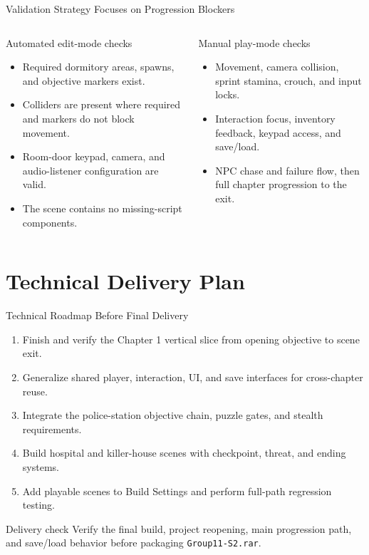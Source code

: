 \documentclass[aspectratio=169,10pt]{beamer}
\begin{document}
\begin{frame}{Validation Strategy Focuses on Progression Blockers}
  \begin{columns}[T,onlytextwidth]
    \begin{block}{Automated edit-mode checks}
      \begin{itemize}
        \item Required dormitory areas, spawns, and objective markers exist.
        \item Colliders are present where required and markers do not block movement.
        \item Room-door keypad, camera, and audio-listener configuration are valid.
        \item The scene contains no missing-script components.
      \end{itemize}
    \end{block}
    \begin{block}{Manual play-mode checks}
      \begin{itemize}
        \item Movement, camera collision, sprint stamina, crouch, and input locks.
        \item Interaction focus, inventory feedback, keypad access, and save/load.
        \item NPC chase and failure flow, then full chapter progression to the exit.
      \end{itemize}
    \end{block}
  \end{columns}
\end{frame}

\section{Technical Delivery Plan}
\begin{frame}{Technical Roadmap Before Final Delivery}
  \begin{enumerate}
    \item Finish and verify the Chapter 1 vertical slice from opening objective to scene exit.
    \item Generalize shared player, interaction, UI, and save interfaces for cross-chapter reuse.
    \item Integrate the police-station objective chain, puzzle gates, and stealth requirements.
    \item Build hospital and killer-house scenes with checkpoint, threat, and ending systems.
    \item Add playable scenes to Build Settings and perform full-path regression testing.
  \end{enumerate}

  \vspace{0.2cm}
  \begin{alertblock}{Delivery check}
    Verify the final build, project reopening, main progression path, and save/load behavior before packaging \texttt{Group11-S2.rar}.
  \end{alertblock}
\end{frame}
\end{document}
